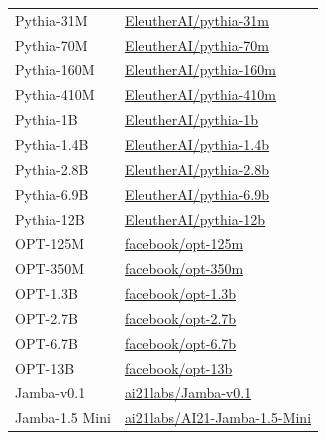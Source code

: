 \begin{table}[htbp]
\begin{center}
\begin{tabular}{l|l}
Pythia-31M & \href{https://huggingface.co/EleutherAI/pythia-31m}{EleutherAI/pythia-31m} \\
Pythia-70M & \href{https://huggingface.co/EleutherAI/pythia-70m}{EleutherAI/pythia-70m} \\
Pythia-160M & \href{https://huggingface.co/EleutherAI/pythia-160m}{EleutherAI/pythia-160m} \\
Pythia-410M & \href{https://huggingface.co/EleutherAI/pythia-410m}{EleutherAI/pythia-410m} \\
Pythia-1B & \href{https://huggingface.co/EleutherAI/pythia-1b}{EleutherAI/pythia-1b} \\
Pythia-1.4B & \href{https://huggingface.co/EleutherAI/pythia-1.4b}{EleutherAI/pythia-1.4b} \\
Pythia-2.8B & \href{https://huggingface.co/EleutherAI/pythia-2.8b}{EleutherAI/pythia-2.8b} \\
Pythia-6.9B & \href{https://huggingface.co/EleutherAI/pythia-6.9b}{EleutherAI/pythia-6.9b} \\
Pythia-12B & \href{https://huggingface.co/EleutherAI/pythia-12b}{EleutherAI/pythia-12b} \\
\midrule
OPT-125M & \href{https://huggingface.co/facebook/opt-125m}{facebook/opt-125m} \\
OPT-350M & \href{https://huggingface.co/facebook/opt-350m}{facebook/opt-350m} \\
OPT-1.3B & \href{https://huggingface.co/facebook/opt-1.3b}{facebook/opt-1.3b} \\
OPT-2.7B & \href{https://huggingface.co/facebook/opt-2.7b}{facebook/opt-2.7b} \\
OPT-6.7B & \href{https://huggingface.co/facebook/opt-6.7b}{facebook/opt-6.7b} \\
OPT-13B & \href{https://huggingface.co/facebook/opt-13b}{facebook/opt-13b} \\
\midrule
Jamba-v0.1 &  \href{https://huggingface.co/ai21labs/Jamba-v0.1}{ai21labs/Jamba-v0.1} \\
Jamba-1.5 Mini & \href{https://huggingface.co/ai21labs/AI21-Jamba-1.5-Mini}{ai21labs/AI21-Jamba-1.5-Mini} \\
\bottomrule
\end{tabular}
\end{center}
\label{model_link}
\end{table}



